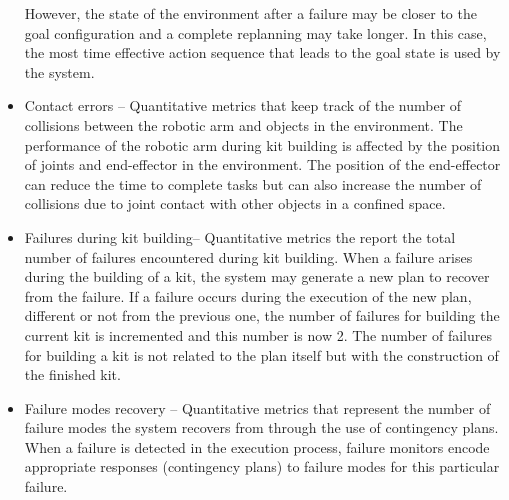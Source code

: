 \begin{itemize}
    However, the state of the environment after a failure may be closer to the goal configuration and a complete replanning may take longer. In this case, the most time effective action sequence that leads to the goal state is used by the system.\\
\item \sf Contact errors \rm -- Quantitative metrics that keep track of the number of collisions between the robotic arm and objects in the environment. The performance of the robotic arm during kit building is affected by the position of joints and end-effector in the environment. The position of the end-effector can reduce the time to complete tasks but can also increase the number of collisions due to joint contact with other objects in a confined space.\\
\item \sf Failures during kit building\rm -- Quantitative metrics the report the total number of failures encountered during kit building. When a failure arises during the building of a kit, the system may generate a new plan to recover from the failure. If a failure occurs during the execution of the new plan, different or not from the previous one, the number of failures for building the current kit is incremented and this number is now 2. The number of failures for building a kit is not related to the plan itself but with the construction of the finished kit. \\
\item \sf Failure modes recovery \rm -- Quantitative metrics that represent the number of failure modes the system recovers from through the use of contingency plans. When a failure is detected in the execution process, failure monitors encode appropriate responses (contingency plans) to failure modes for this particular failure.\\

\end{itemize}
